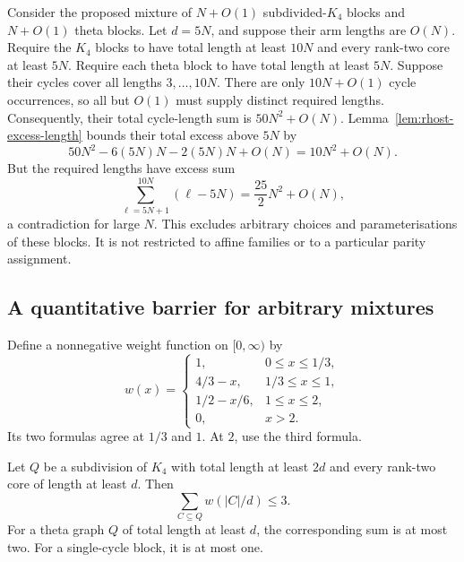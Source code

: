 Consider the proposed mixture of $N+O(1)$ subdivided-$K_4$ blocks and $N+O(1)$ theta blocks.
Let $d=5N$, and suppose their arm lengths are $O(N)$.
Require the $K_4$ blocks to have total length at least $10N$ and every rank-two core at least $5N$.
Require each theta block to have total length at least $5N$.
Suppose their cycles cover all lengths $3,\ldots,10N$.
There are only $10N+O(1)$ cycle occurrences, so all but $O(1)$ must supply distinct required lengths.
Consequently, their total cycle-length sum is $50N^2+O(N)$.
Lemma~\ref{lem:rhost-excess-length} bounds their total excess above $5N$ by
\[
 50N^2-6(5N)N-2(5N)N+O(N)=10N^2+O(N).
\]
But the required lengths have excess sum
\[
 \sum_{\ell=5N+1}^{10N}(\ell-5N)
 =\frac{25}{2}N^2+O(N),
\]
a contradiction for large $N$.
This excludes arbitrary choices and parameterisations of these blocks.
It is not restricted to affine families or to a particular parity assignment.

\subsection{A quantitative barrier for arbitrary mixtures}

Define a nonnegative weight function on $[0,\infty)$ by
\[
 w(x)=
 \begin{cases}
 1,&0\le x\le1/3,\\
 4/3-x,&1/3\le x\le1,\\
 1/2-x/6,&1\le x\le2,\\
 0,&x>2.
 \end{cases}
\]
Its two formulas agree at $1/3$ and $1$.
At $2$, use the third formula.

\begin{lemma}\label{lem:rhost-block-weight}
Let $Q$ be a subdivision of $K_4$ with total length at least $2d$ and every rank-two core of length at least $d$.
Then
\[
 \sum_{C\subseteq Q}w(|C|/d)\le3.
\]
For a theta graph $Q$ of total length at least $d$, the corresponding sum is at most two.
For a single-cycle block, it is at most one.
\end{lemma}

